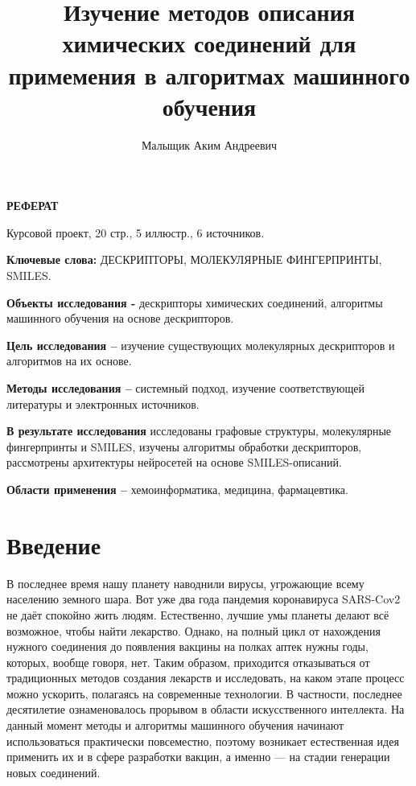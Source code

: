 \documentclass[a4paper,14pt]{extreport}
\title{Изучение методов описания химических соединений для примемения в алгоритмах машинного обучения}
\author{Малыщик Аким Андреевич}
\begin{document}
\maketitle
\setcounter{page}{2}
\begin{center}
  \large\bfseries{РЕФЕРАТ}
\end{center}

Курсовой проект, 20 стр., 5 иллюстр., 6 источников.

\textbf{Ключевые слова:} ДЕСКРИПТОРЫ, МОЛЕКУЛЯРНЫЕ ФИНГЕРПРИНТЫ, SMILES.

\textbf{Объекты исследования -} дескрипторы химических соединений, алгоритмы машинного обучения на основе дескрипторов.

\textbf{Цель исследования --} изучение существующих молекулярных дескрипторов и алгоритмов на их основе.

\textbf{Методы исследования --} системный подход, изучение соответствующей литературы и электронных источников.

\textbf{В результате исследования} исследованы графовые структуры, молекулярные фингерпринты и SMILES, изучены алгоритмы обработки дескрипторов, рассмотрены архитектуры нейросетей на основе SMILES-описаний.

\textbf{Области применения --} хемоинформатика, медицина, фармацевтика.

\newpage
  {
    \renewcommand{\contentsname}{Содержание}
    
    \tableofcontents
  }

  \chapter*{Введение}
  \label{c:introduction}
  В последнее время нашу планету наводнили вирусы, угрожающие всему населению земного шара. Вот уже два года пандемия коронавируса SARS-Cov2 не даёт спокойно жить людям. Естественно, лучшие умы планеты делают всё возможное, чтобы найти лекарство. Однако, на полный цикл от нахождения нужного соединения до появления вакцины на полках аптек нужны годы, которых, вообще говоря, нет. Таким образом, приходится отказываться от традиционных методов создания лекарств и исследовать, на каком этапе процесс можно ускорить, полагаясь на современные технологии. В частности, последнее десятилетие ознаменовалось прорывом в области искусственного интеллекта. На данный момент методы и алгоритмы машинного обучения начинают использоваться практически повсеместно, поэтому возникает естественная идея применить их и в сфере разработки вакцин, а именно — на стадии генерации новых соединений.
  
\end{document}
